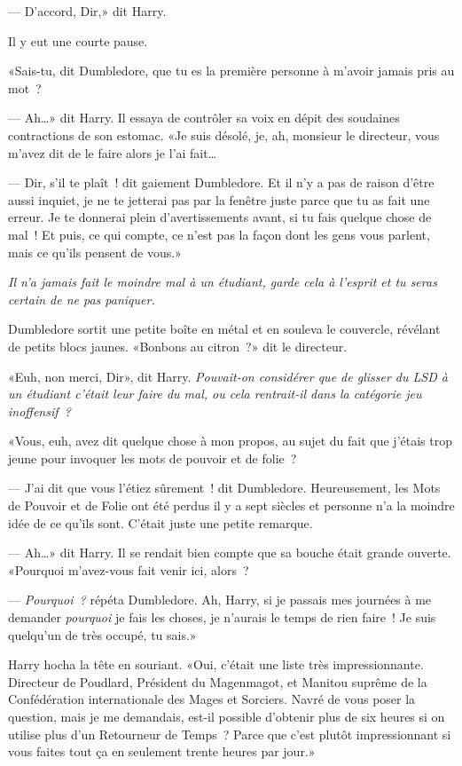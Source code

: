 --- D'accord, Dir,» dit Harry.

Il y eut une courte pause.

«Sais-tu, dit Dumbledore, que tu es la première personne à m'avoir jamais pris au mot~?

--- Ah…» dit Harry. Il essaya de contrôler sa voix en dépit des soudaines contractions de son estomac. «Je suis désolé, je, ah, monsieur le directeur, vous m'avez dit de le faire alors je l'ai fait…

--- Dir, s'il te plaît~! dit gaiement Dumbledore. Et il n'y a pas de raison d'être aussi inquiet, je ne te jetterai pas par la fenêtre juste parce que tu as fait une erreur. Je te donnerai plein d'avertissements avant, si tu fais quelque chose de mal~! Et puis, ce qui compte, ce n'est pas la façon dont les gens vous parlent, mais ce qu'ils pensent de vous.»

\emph{Il n'a jamais fait le moindre mal à un étudiant, garde cela à l'esprit et tu seras certain de ne pas paniquer.}

Dumbledore sortit une petite boîte en métal et en souleva le couvercle, révélant de petits blocs jaunes. «Bonbons au citron~?» dit le directeur.

«Euh, non merci, Dir», dit Harry. \emph{Pouvait-on considérer que de glisser du LSD à un étudiant c'était leur faire du mal, ou cela rentrait-il dans la catégorie jeu inoffensif~?}

«Vous, euh, avez dit quelque chose à mon propos, au sujet du fait que j'étais trop jeune pour invoquer les mots de pouvoir et de folie~?

--- J'ai dit que vous l'étiez sûrement~! dit Dumbledore. Heureusement, les Mots de Pouvoir et de Folie ont été perdus il y a sept siècles et personne n'a la moindre idée de ce qu'ils sont. C'était juste une petite remarque.

--- Ah…» dit Harry. Il se rendait bien compte que sa bouche était grande ouverte. «Pourquoi m'avez-vous fait venir ici, alors~?

--- \emph{Pourquoi~?} répéta Dumbledore. Ah, Harry, si je passais mes journées à me demander \emph{pourquoi} je fais les choses, je n'aurais le temps de rien faire~! Je suis quelqu'un de très occupé, tu sais.»

Harry hocha la tête en souriant. «Oui, c'était une liste très impressionnante. Directeur de Poudlard, Président du Magenmagot, et Manitou suprême de la Confédération internationale des Mages et Sorciers. Navré de vous poser la question, mais je me demandais, est-il possible d'obtenir plus de six heures si on utilise plus d'un Retourneur de Temps~? Parce que c'est plutôt impressionnant si vous faites tout ça en seulement trente heures par jour.»

